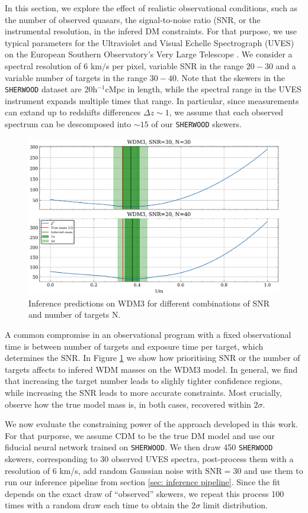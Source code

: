 In this section, we explore the effect of realistic observational conditions, such as the number of observed quasars, the signal-to-noise ratio (SNR, or the instrumental resolution, in the infered DM constraints. For that purpose, we use typical parameters for the Ultraviolet and Visual Echelle Spectrograph (UVES) on the European Southern Observatory's Very Large Telescope \cite{Murphy_2018}. We consider a spectral resolution of $6$ km$/$s per pixel, variable SNR in the range $20-30$ and a variable number of targets in the range $30-40$. Note that the skewers in the \texttt{SHERWOOD} dataset are 20h$^{-1}$cMpc in length, while the spectral range in the UVES instrument expands multiple times  that range. In particular, since measurements can extand up to redshifts differences $\Delta z \sim 1$, we assume that each observed spectrum can be descomposed into $\sim 15$ of our \texttt{SHERWOOD} skewers.


\begin{figure}
    \centering
    \includegraphics[width=0.8\linewidth]{img/ML/SNR_vs_N.png}
    \caption{Inference predictions on WDM3 for different combinations of SNR and number of targets N.}
    \label{fig: inference snr vs n}
\end{figure}

A common compromise in an observational program with a fixed observational time is between number of targets and exposure time per target, which determines the SNR. In Figure \ref{fig: inference snr vs n} we show how prioritising SNR or the number of targets affects to infered WDM masses on the WDM3 model. In general, we find that increasing the target number leads to slighly tighter confidence regions, while increasing the SNR leads to more accurate constraints. Most crucially, observe how the true model mass is, in both cases, recovered within $2\sigma$.

We now evaluate the constraining power of the approach developed in this work. For that purporse, we assume CDM to be the true DM model and use our fiducial neural network trained on \texttt{SHERWOOD}. We then draw 450 \texttt{SHERWOOD} skewers, corresponding to 30 observed UVES spectra, post-process them with a resolution of 6 km/s, add random Gaussian noise with $\text{SNR}=30$ and use them to run our inference pipeline from section \ref{sec: inference pipeline}. Since the fit depends on the exact draw of ``observed'' skewers, we repeat this process 100 times with a random draw each time to obtain the $2\sigma$ limit distribution.

